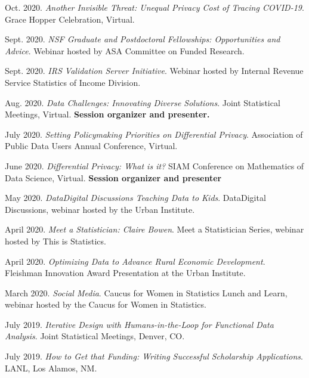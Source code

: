 \begin{etaremune}[topsep=0pt, itemsep=2.5pt, partopsep=0pt, parsep=0pt]
    \item Oct. 2020. \textit{Another Invisible Threat: Unequal Privacy Cost of Tracing COVID-19}. Grace Hopper Celebration, Virtual.
    
    \item Sept. 2020. \textit{NSF Graduate and Postdoctoral Fellowships: Opportunities and Advice}. Webinar hosted by ASA Committee on Funded Research.
    
    \item Sept. 2020. \textit{IRS Validation Server Initiative}. Webinar hosted by Internal Revenue Service Statistics of Income Division.
    
    \item Aug. 2020. \textit{Data Challenges: Innovating Diverse Solutions}. Joint Statistical Meetings, Virtual. \textbf{Session organizer and presenter.}
    
    \item July 2020. \textit{Setting Policymaking Priorities on Differential Privacy}. Association of Public Data Users Annual Conference, Virtual.
    
    \item June 2020. \textit{Differential Privacy: What is it?} SIAM Conference on Mathematics of Data Science, Virtual. \textbf{Session organizer and presenter}
    
    \item May 2020. \textit{Data\@Urban Digital Discussions Teaching Data to Kids}. Data\@Urban Digital Discussions, webinar hosted by the Urban Institute.
    
    \item April 2020. \textit{Meet a Statistician: Claire Bowen}. Meet a Statistician Series, webinar hosted by This is Statistics.
    
    \item April 2020. \textit{Optimizing Data to Advance Rural Economic Development}. Fleishman Innovation Award Presentation at the Urban Institute.
    
    \item March 2020. \textit{Social Media}. Caucus for Women in Statistics Lunch and Learn, webinar hosted by the Caucus for Women in Statistics.
    
    \item July 2019. \textit{Iterative Design with Humans-in-the-Loop for Functional Data Analysis}. Joint Statistical Meetings, Denver, CO. 
    
    \item July 2019. \textit{How to Get that Funding: Writing Successful Scholarship Applications}. LANL, Los Alamos, NM.
    

\end{etaremune}
